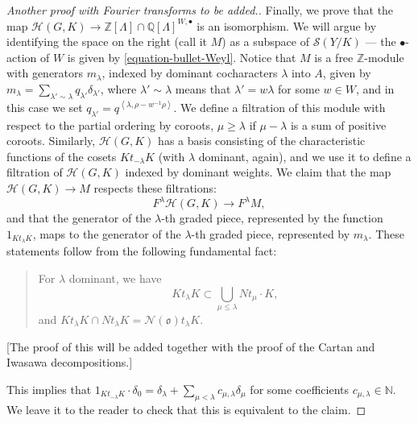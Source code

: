 \begin{proof}
 [Another proof with Fourier transforms to be added.]
 
 Finally, we prove that the map $\mathcal H(G,K) \to  \mathbb Z[\Lambda]\cap \mathbb Q[\Lambda]^{W,\bullet}$ is an isomorphism. We will argue by identifying the space on the right (call it $M$) as a subspace of $\mathcal S(Y/K)$ --- the $\bullet$-action of $W$ is given by \eqref{equation-bullet-Weyl}. Notice that $M$ is a free $\mathbb Z$-module with generators $m_\lambda$, indexed by dominant cocharacters $\lambda$ into $A$, given by $m_\lambda= \sum_{\lambda'\sim \lambda} q_{\lambda'} \delta_{\lambda'}$, where $\lambda' \sim \lambda$ means that $\lambda'=w\lambda$ for some $w\in W$, and in this case we set $q_{\lambda'} = q^{\left < \lambda, \rho - w^{-1}\rho\right>}$. We define a filtration of this module with respect to the partial ordering by coroots, $\mu \ge \lambda$ if $\mu-\lambda$ is a sum of positive coroots. Similarly, $\mathcal H(G,K)$ has a basis consisting of the characteristic functions of the cosets $Kt_{-\lambda} K$ (with $\lambda$ dominant, again), and we use it to define a filtration of $\mathcal H(G,K)$ indexed by dominant weights. We claim that the map $\mathcal H(G,K)\to M$ respects these filtrations:
 $$ F^\lambda \mathcal H(G,K)\to F^\lambda M,$$
 and that the generator of the $\lambda$-th graded piece, represented by the function $1_{Kt_\lambda K}$, maps to the generator of the $\lambda$-th graded piece, represented by $m_\lambda$. These statements follow from the following fundamental fact:
 
 \begin{quote}
  For $\lambda$ dominant, we have 
\begin{equation}
\label{equation-Hecke-action-preflag} 
K t_\lambda K \subset \bigcup_{\mu\le \lambda} N t_\mu\cdot K,
\end{equation}
and $K t_\lambda K \cap N t_\lambda K = \mathcal N(\mathfrak o)  t_\lambda  K$. 
 \end{quote}

 [The proof of this will be added together with the proof of the Cartan and Iwasawa decompositions.]
 
This implies that $1_{K t_{-\lambda} K} \cdot \delta_0 = \delta_\lambda + \sum_{\mu<\lambda} c_{\mu,\lambda} \delta_\mu$ for some coefficients $c_{\mu, \lambda}\in\mathbb N$. We leave it to the reader to check that this is equivalent to the claim.
 
\end{proof}















